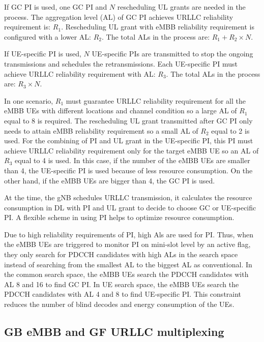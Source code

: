\documentclass{ieeeaccess}
\begin{document}
If GC PI is used, one GC PI and $N$ rescheduling UL grants are needed in the process. The aggregation level (AL) of GC PI achieves URLLC reliability requirement is: $R_{1}$. Rescheduling UL grant with eMBB reliability requirement is configured with a lower AL: $R_{2}$. The total ALs in the process are: $R_{1} + R_{2}\times N$.

If UE-specific PI is used, $N$ UE-specific PIs are transmitted to stop the ongoing transmissions and schedules the retransmissions. Each UE-specific PI must achieve URLLC reliability requirement with AL: $R_{3}$. The total ALs in the process are: $R_{3}\times N$.

In one scenario, $R_{1}$ must guarantee URLLC reliability requirement for all the eMBB UEs with different locations and channel condition so a large AL of $R_{1}$ equal to 8 is required. The rescheduling UL grant transmitted after GC PI only needs to attain eMBB reliability requirement so a small AL of $R_{2}$ equal to 2 is used. For the combining of PI and UL grant in the UE-specific PI, this PI must achieve URLLC reliability requirement only for the target eMBB UE so an AL of $R_{3}$ equal to 4 is used. In this case, if the number of the eMBB UEs are smaller than 4, the UE-specific PI is used because of less resource consumption. On the other hand, if the eMBB UEs are bigger than 4, the GC PI is used.

At the time, the gNB schedules URLLC transmission, it calculates the resource consumption in DL with PI and UL grant to decide to choose GC or UE-specific PI. A flexible scheme in using PI helps to optimize resource consumption.

Due to high reliability requirements of PI, high Als are used for PI. Thus, when the eMBB UEs are triggered to monitor PI on mini-slot level by an active flag, they only search for PDCCH candidates with high ALs in the search space instead of searching from the smallest AL to the biggest AL as conventional. In the common search space, the eMBB UEs search the PDCCH candidates with AL 8 and 16 to find GC PI. In UE search space, the eMBB UEs search the PDCCH candidates with AL 4 and 8 to find UE-specific PI. This constraint reduces the number of blind decodes and energy consumption of the UEs.

\subsection{GB eMBB and GF URLLC multiplexing}\label{IIB}
\end{document}
